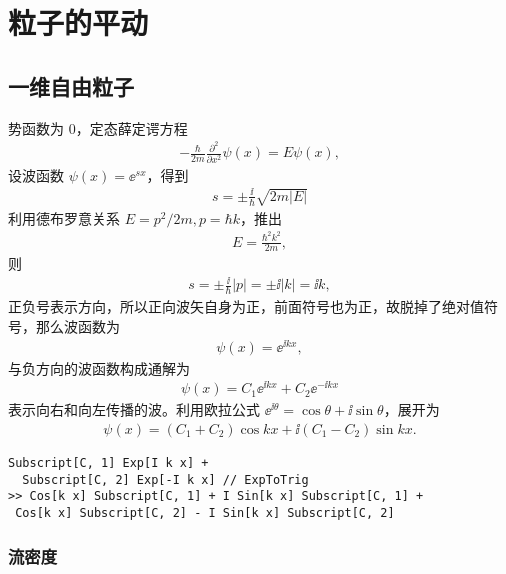 \chapter{粒子的平动}

\section{一维自由粒子}

势函数为 0，定态薛定谔方程
\begin{eqnarray}
    -\frac{\hbar}{2m} \frac{\partial^2}{\partial x^2}\psi(x) = E \psi(x),
\end{eqnarray}
设波函数 $\psi(x) = \ee^{s x}$，得到
\begin{eqnarray}
    s = \pm \frac{\ii}{\hbar} \sqrt{2m |E|}
\end{eqnarray}
利用德布罗意关系 $E = p^2 / 2m, p = \hbar k$，推出
\begin{eqnarray}
    E = \frac{\hbar^2k^2}{2m},
\end{eqnarray}
则
\begin{eqnarray}
    s = \pm \frac{\ii}{\hbar}|p| = \pm \ii |k| = \ii k,
\end{eqnarray}
正负号表示方向，所以正向波矢自身为正，前面符号也为正，故脱掉了绝对值符号，那么波函数为
\begin{eqnarray}
    \psi(x) = \ee^{\ii kx},
\end{eqnarray}
与负方向的波函数构成通解为
\begin{eqnarray}
    \psi(x) = C_1 \ee^{\ii kx} + C_2 \ee^{-\ii kx}
\end{eqnarray}
表示向右和向左传播的波。利用欧拉公式 $\ee^{\ii\theta} = \cos\theta + \ii\sin\theta$，展开为
\begin{eqnarray}
    \psi(x) = (C_1 + C_2) \cos kx + \ii (C_1 - C_2) \sin kx.  
\end{eqnarray}
\begin{lstlisting}
Subscript[C, 1] Exp[I k x] + 
  Subscript[C, 2] Exp[-I k x] // ExpToTrig
>> Cos[k x] Subscript[C, 1] + I Sin[k x] Subscript[C, 1] + 
 Cos[k x] Subscript[C, 2] - I Sin[k x] Subscript[C, 2]
\end{lstlisting}

\subsection{流密度}

